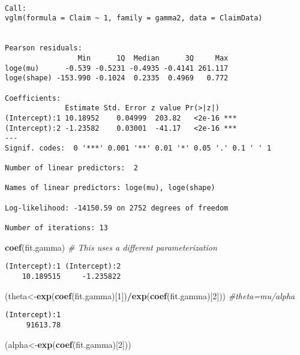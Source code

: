 \documentclass[]{book}
\newenvironment{Shaded}{\begin{snugshade}}{\end{snugshade}}
\newcommand{\KeywordTok}[1]{\textcolor[rgb]{0.13,0.29,0.53}{\textbf{#1}}}
\newcommand{\DecValTok}[1]{\textcolor[rgb]{0.00,0.00,0.81}{#1}}
\newcommand{\CommentTok}[1]{\textcolor[rgb]{0.56,0.35,0.01}{\textit{#1}}}
\newcommand{\OperatorTok}[1]{\textcolor[rgb]{0.81,0.36,0.00}{\textbf{#1}}}
\newcommand{\NormalTok}[1]{#1}
\theoremstyle{definition}
\theoremstyle{definition}
\theoremstyle{definition}
\theoremstyle{remark}
\begin{document}
\begin{verbatim}

Call:
vglm(formula = Claim ~ 1, family = gamma2, data = ClaimData)


Pearson residuals:
                 Min      1Q  Median      3Q     Max
loge(mu)      -0.539 -0.5231 -0.4935 -0.4141 261.117
loge(shape) -153.990 -0.1024  0.2335  0.4969   0.772

Coefficients: 
              Estimate Std. Error z value Pr(>|z|)    
(Intercept):1 10.18952    0.04999  203.82   <2e-16 ***
(Intercept):2 -1.23582    0.03001  -41.17   <2e-16 ***
---
Signif. codes:  0 '***' 0.001 '**' 0.01 '*' 0.05 '.' 0.1 ' ' 1

Number of linear predictors:  2 

Names of linear predictors: loge(mu), loge(shape)

Log-likelihood: -14150.59 on 2752 degrees of freedom

Number of iterations: 13 
\end{verbatim}

\begin{Shaded}
\begin{Highlighting}[]
\KeywordTok{coef}\NormalTok{(fit.gamma)                 }\CommentTok{# This uses a different parameterization }
\end{Highlighting}
\end{Shaded}

\begin{verbatim}
(Intercept):1 (Intercept):2 
    10.189515     -1.235822 
\end{verbatim}

\begin{Shaded}
\begin{Highlighting}[]
\NormalTok{(theta<-}\KeywordTok{exp}\NormalTok{(}\KeywordTok{coef}\NormalTok{(fit.gamma)[}\DecValTok{1}\NormalTok{])}\OperatorTok{/}\KeywordTok{exp}\NormalTok{(}\KeywordTok{coef}\NormalTok{(fit.gamma)[}\DecValTok{2}\NormalTok{])) }\CommentTok{#theta=mu/alpha}
\end{Highlighting}
\end{Shaded}

\begin{verbatim}
(Intercept):1 
     91613.78 
\end{verbatim}

\begin{Shaded}
\begin{Highlighting}[]
\NormalTok{(alpha<-}\KeywordTok{exp}\NormalTok{(}\KeywordTok{coef}\NormalTok{(fit.gamma)[}\DecValTok{2}\NormalTok{]))}
\end{Highlighting}
\end{Shaded}
\end{document}
